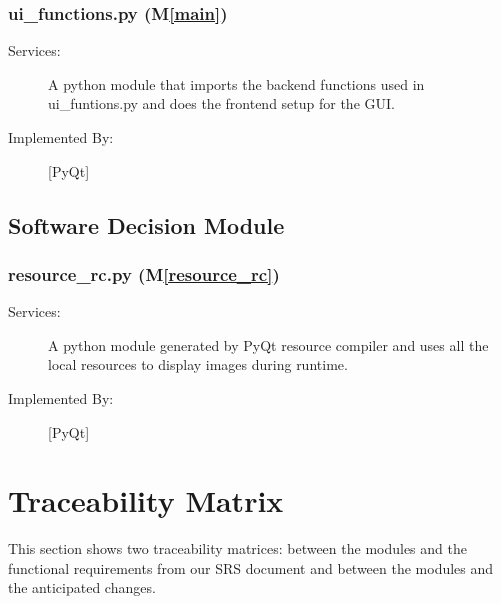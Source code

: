 \documentclass[12pt, titlepage]{article}
\newcommand{\mref}[1]{M\ref{#1}}
\begin{document}
\subsubsection{ui\_functions.py (\mref{main})}
\begin{description}
\item[Services:] A python module that imports the backend functions used in ui\_funtions.py and does the frontend setup for the GUI.
\item[Implemented By:] [PyQt]
\end{description}

\subsection{Software Decision Module}

\subsubsection{resource\_rc.py (\mref{resource_rc})}

\begin{description}

  \item[Services:] A python module generated by PyQt resource compiler and uses all the local resources to display images during runtime.
  \item[Implemented By:] [PyQt] 
  \end{description}

\newpage
\section{Traceability Matrix} \label{SecTM}

This section shows two traceability matrices: between the modules and the
functional requirements from our SRS document and between the modules and the anticipated changes.
\end{document}
